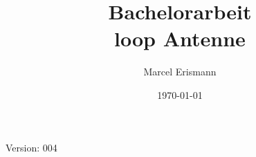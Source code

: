\documentclass[10pt,a4paper]{article}
\author{Marcel Erismann}
\date{\today}
\title{Bachelorarbeit \\ \footnotesize{loop Antenne}}
\begin{document}
	
	Version: 004
	\tableofcontents 
	\newpage
	
\end{document}
